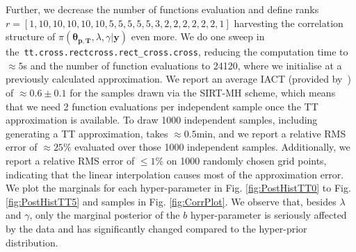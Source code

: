 Further, we decrease the number of functions evaluation and define ranks \linebreak$r = [ 1,  10,  10, 10, 10, 10, 5, 5, 5, 5, 5, 3, 2, 2, 2, 2, 2, 2, 1]$ harvesting the correlation structure of $\pi(\bm{\theta}_{\bm{p}, \bm{T}},\lambda,\gamma  | \bm{y})$ even more.
We do one sweep in \linebreak the~\texttt{tt.cross.rectcross.rect\_cross.cross}, reducing the computation time to $\approx 5$s and the number of function evaluations to 24120, where we initialise at a previously calculated approximation.
We report an average IACT (provided by~\cite{wolff2004monte, drikHesse}) of $\approx 0.6 \pm 0.1$ for the samples drawn via the SIRT-MH scheme, which means that we need 2 function evaluations per independent sample once the TT approximation is available.
To draw 1000 independent samples, including generating a TT approximation, takes $\approx0.5$min, and we report a relative RMS error of $\approx 25 \%$ evaluated over those 1000 independent samples.
Additionally, we report a relative RMS error of $\leq 1\%$ on 1000 randomly chosen grid points, indicating that the linear interpolation causes most of the approximation error. 
We plot the marginals for each hyper-parameter in Fig. \ref{fig:PostHistTT0} to Fig. \ref{fig:PostHistTT5} and samples in Fig. \ref{fig:CorrPlot}.
We observe that, besides $\lambda$ and $\gamma$, only the marginal posterior of the $b$ hyper-parameter is seriously affected by the data and has significantly changed compared to the hyper-prior distribution.
\clearpage

